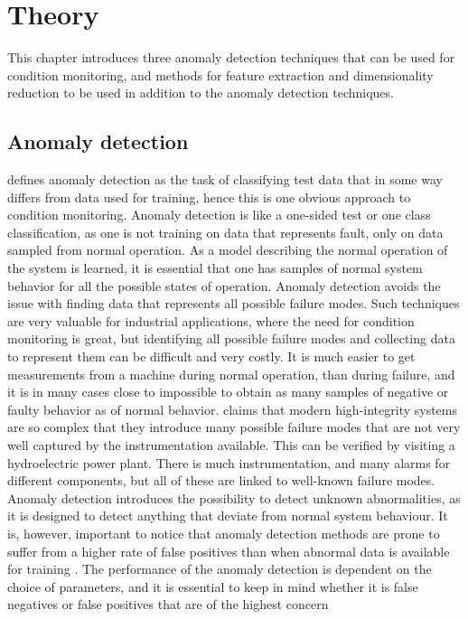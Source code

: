 \chapter{Theory}\label{cha:litterature}

This chapter introduces three anomaly detection techniques that can be used for condition monitoring, and methods for feature extraction and dimensionality reduction to be used in addition to the anomaly detection techniques. 


\section{Anomaly detection}\label{sec:novelty_detection}
    \cite{Pimentel2014} defines anomaly detection as the task of classifying test data that in some way differs from data used for training, hence this is one obvious approach to condition monitoring. Anomaly detection is like a one-sided test or one class classification, as one is not training on data that represents fault, only on data sampled from normal operation. As a model describing the normal operation of the system is learned, it is essential that one has samples of normal system behavior for all the possible states of operation. Anomaly detection avoids the issue with finding data that represents all possible failure modes. Such techniques are very valuable for industrial applications, where the need for condition monitoring is great, but identifying all possible failure modes and collecting data to represent them can be difficult and very costly. It is much easier to get measurements from a machine during normal operation, than during failure, and it is in many cases close to impossible to obtain as many samples of negative or faulty behavior as of normal behavior. \cite{Tarassenko2009} claims that modern high-integrity systems are so complex that they introduce many possible failure modes that are not very well captured by the instrumentation available. This can be verified by visiting a hydroelectric power plant. There is much instrumentation, and many alarms for different components, but all of these are linked to well-known failure modes. Anomaly detection introduces the possibility to detect unknown abnormalities, as it is designed to detect anything that deviate from normal system behaviour. It is, however, important to notice that anomaly detection methods are prone to suffer from a higher rate of false positives than when abnormal data is available for training \cite{Latecki}. The performance of the anomaly detection is dependent on the choice of parameters, and it is essential to keep in mind whether it is false negatives or false positives that are of the highest concern 
    
